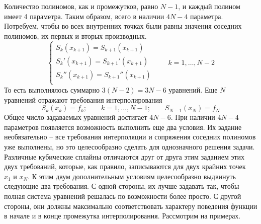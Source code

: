 \documentclass[../../calc-math-exam-2023.tex]{subfiles}
\begin{document}
    Количество полиномов, как и промежутков, равно $N - 1$, и каждый полином имеет 4 параметра.
    Таким образом, всего в наличии $4N - 4$ параметра. Потребуем, чтобы во всех внутренних точках
    были равны значения соседних полиномов, их первых и вторых производных.
    \begin{equation*}
        \begin{cases}
            \displaystyle S_k(x_{k+1}) = S_{k+1}(x_{k+1})\\
            S_k'(x_{k+1}) = S_{k+1}'(x_{k+1})\\
            S_k''(x_{k+1}) = S_{k+1}''(x_{k+1})\\
        \end{cases}
        \qquad k = 1,\dots,N-2
    \end{equation*}
    То есть выполнялось суммарно $3(N-2) = 3N - 6$ уравнений. Еще $N$ уравнений отражают требования
    интерполирования
    \begin{equation*}
        \displaystyle S_k(x_k) = f_k; \qquad k = 1, \dots, N-1; \qquad S_{N-1}(x_N) = f_N
    \end{equation*}
    Общее число задаваемых уравнений достигает $4N - 6$. При наличии $4N - 4$ параметров
    появляется возможность выполнить еще два условия. Их задание необязательно -- все требования
    интерполяции и сопряжения соседних полиномов уже выполнены, но это целесообразно сделать для
    однозначного решения задачи. Различные кубические сплайны отличаются друг от друга этим заданием
    этих двух требований, которые, как правило, записываются для двух крайних точек $x_1 \text{ и } x_N$.
    К этим двум дополнительным условиям целесообразно выдвинуть следующие два требования. С одной стороны,
    их лучше задавать так, чтобы полная система уравнений решалась по возможности более просто. С другой
    стороны, они должны максимально соответствовать характеру поведения функции в начале и в конце
    промежутка интерполирования. Рассмотрим на примерах.
    \vspace{10pt}
\end{document}
